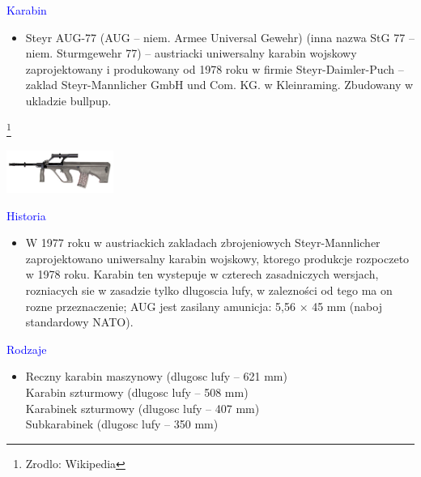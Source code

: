 \documentclass[landscape]{slides}
\begin{document}
\begin{slide}
\centering
\textcolor{blue}{\Large{Karabin}}
\begin{itemize}
\item{Steyr AUG-77 (AUG – niem. Armee Universal Gewehr) (inna nazwa StG 77 – niem. Sturmgewehr 77) – austriacki uniwersalny karabin wojskowy zaprojektowany i produkowany od 1978 roku w firmie Steyr-Daimler-Puch – zaklad Steyr-Mannlicher GmbH und Com. KG. w Kleinraming. Zbudowany w ukladzie bullpup.}
\end{itemize}
\footnote{Zrodlo: Wikipedia}
\end{slide}


\begin{slide}
\begin{flushleft}
\includegraphics[width=3.5cm, angle=-10]{kaabin.jpg}
\end{flushleft}
\end{slide}


\begin{slide}
\centering
\textcolor{blue}{\Large{Historia}}
\begin{itemize}
\item
{W 1977 roku w austriackich zakladach zbrojeniowych Steyr-Mannlicher zaprojektowano uniwersalny karabin wojskowy, ktorego produkcje rozpoczeto w 1978 roku. Karabin ten wystepuje w czterech zasadniczych wersjach, rozniacych sie w zasadzie tylko dlugoscia lufy, w zalezności od tego ma on rozne przeznaczenie;
AUG jest zasilany amunicja: 5,56 × 45 mm (naboj standardowy NATO).}
\end{itemize}
\end{slide}

\begin{slide}
\centering
\textcolor{blue}{\Large{Rodzaje}}
\begin{itemize}
	\item 
Reczny karabin maszynowy (dlugosc lufy – 621 mm)\\
Karabin szturmowy (dlugosc lufy – 508 mm)\\
Karabinek szturmowy (dlugosc lufy – 407 mm)\\
Subkarabinek (dlugosc lufy – 350 mm)\\
\end{itemize}
\end{slide}
\end{document}
